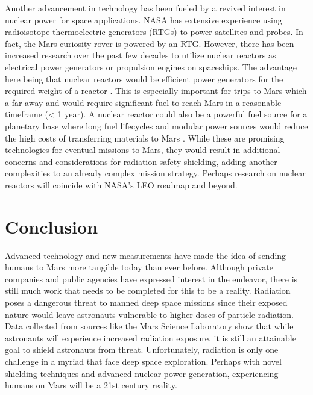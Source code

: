 Another advancement in technology has been fueled by a revived interest in nuclear power for space applications. NASA has extensive experience using radioisotope thermoelectric generators (RTGs) to power satellites and probes. In fact, the Mars curiosity rover is powered by an RTG. However, there has been increased research over the past few decades to utilize nuclear reactors as electrical power generators \cite{gibson} or propulsion engines \cite{gates} on spaceships. The advantage here being that nuclear reactors would be efficient power generators for the required weight of a reactor \cite{li-et-al}. This is especially important for trips to Mars which a far away and would require significant fuel to reach Mars in a reasonable timeframe (< 1 year). A nuclear reactor could also be a powerful fuel source for a planetary base where long fuel lifecycles and modular power sources would reduce the high costs of transferring materials to Mars \cite{schillo}. While these are promising technologies for eventual missions to Mars, they would result in additional concerns and considerations for radiation safety shielding, adding another complexities to an already complex mission strategy. Perhaps research on nuclear reactors will coincide with NASA’s LEO roadmap \cite{nasa-propulsion} and beyond.

\section{Conclusion}

Advanced technology and new measurements have made the idea of sending humans to Mars more tangible today than ever before. Although private companies and public agencies have expressed interest in the endeavor, there is still much work that needs to be completed for this to be a reality. Radiation poses a dangerous threat to manned deep space missions since their exposed nature would leave astronauts vulnerable to higher doses of particle radiation. Data collected from sources like the Mars Science Laboratory show that while astronauts will experience increased radiation exposure, it is still an attainable goal to shield astronauts from threat. Unfortunately, radiation is only one challenge in a myriad that face deep space exploration. Perhaps with novel shielding techniques and advanced nuclear power generation, experiencing humans on Mars will be a 21st century reality.
